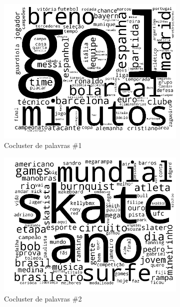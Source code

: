 \documentclass[
    12pt,                %
    oneside,            %
    a4paper,            %
    english,            %
    brazil                %
    ]{abntex2ppgsi}
\begin{document}
\begin{figure}[H]
\centering
    \begin{subfigure}[b]{0.31\textwidth}
        \includegraphics[width=\textwidth]{img/onmtf-tc-1.png}
        \caption{Cocluster de palavras \#1}
    \end{subfigure}
    \begin{subfigure}[b]{0.31\textwidth}
        \includegraphics[width=\textwidth]{img/onmtf-tc-2.png}
        \caption{Cocluster de palavras \#2}
    \end{subfigure}
    \begin{subfigure}[b]{0.31\textwidth}

\end{subfigure}
\end{figure}
\end{document}
